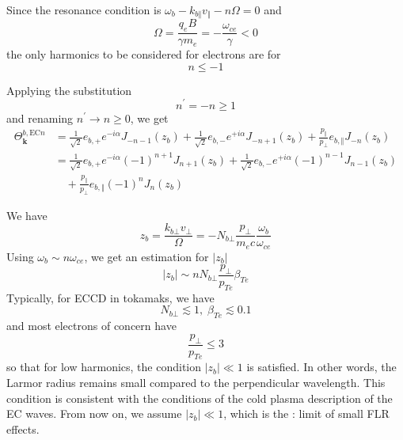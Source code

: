 Since the resonance condition is $\omega_{b}-k_{b\Vert}v_{\Vert}-n\Omega=0$
and
\begin{equation}
\Omega=\frac{q_{e}B}{\gamma m_{e}}=-\frac{\omega_{ce}}{\gamma}<0
\end{equation}
the only harmonics to be considered for electrons are for
\begin{equation}
n\leq-1
\end{equation}

Applying the substitution
\begin{equation}
n^{\prime}=-n\geq1
\end{equation}
and renaming $n^{\prime}\rightarrow n\geq0$, we get
\begin{align}
\Theta_{\mathbf{k}}^{b,\text{EC}n} &  =\frac{1}{\sqrt{2}}e_{b,+}e^{-i\alpha
}J_{-n-1}\left(  z_{b}\right)  +\frac{1}{\sqrt{2}}e_{b,-}e^{+i\alpha}%
J_{-n+1}\left(  z_{b}\right)  +\frac{p_{\Vert}}{p_{\bot}}e_{b,\Vert}%
J_{-n}\left(  z_{b}\right) \nonumber\\
&  =\frac{1}{\sqrt{2}}e_{b,+}e^{-i\alpha}\left(  -1\right)  ^{n+1}%
J_{n+1}\left(  z_{b}\right)  +\frac{1}{\sqrt{2}}e_{b,-}e^{+i\alpha}\left(
-1\right)  ^{n-1}J_{n-1}\left(  z_{b}\right) \nonumber\\&\quad +\frac{p_{\Vert}}{p_{\bot}%
}e_{b,\Vert}\left(  -1\right)  ^{n}J_{n}\left(  z_{b}\right)
\label{thetaEC}
\end{align}

We have
\begin{equation}
z_{b}=\frac{k_{b\bot}v_{\bot}}{\Omega}=-N_{b\bot}\frac{p_{\bot}}{m_{e}c}%
\frac{\omega_{b}}{\omega_{ce}}%
\end{equation}
Using $\omega_{b}\sim n\omega_{ce}$, we get an estimation for $\left|
z_{b}\right|  $%
\begin{equation}
\left|  z_{b}\right|  \sim nN_{b\bot}\frac{p_{\bot}}{p_{Te}}\beta_{Te}%
\end{equation}
Typically, for ECCD in tokamaks, we have
\begin{equation}
N_{b\bot}\lesssim1,\;\beta_{Te}\lesssim0.1
\end{equation}
and most electrons of concern have
\begin{equation}
\frac{p_{\bot}}{p_{Te}}\leq3
\end{equation}
so that for low harmonics, the condition $\left|  z_{b}\right|  \ll1$ is
satisfied. In other words, the Larmor radius remains small compared to the
perpendicular wavelength. This condition is consistent with the conditions of
the cold plasma description of the EC waves. From now on, we assume $\left|
z_{b}\right|  \ll1$, which is the : limit of small FLR effects.

